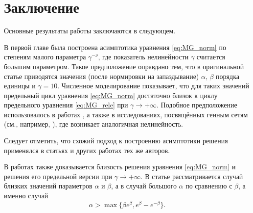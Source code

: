 \chapter*{Заключение}                       %


Основные результаты работы заключаются в следующем.


В первой главе была построена асимптотика уравнения \eqref{eq:MG_norm} по степеням малого параметра $\gamma^{-\nu}$, где показатель нелинейности $\gamma$ считается большим параметром. Такое предположение оправдано тем, что в оригинальной статье \cite{Mackey1977} приводятся значения (после нормировки на запаздывание) $\alpha$, $\beta$ порядка единицы и $\gamma = 10$. Численное моделирование показывает, что для таких значений предельный цикл уравнения \eqref{eq:MG_norm} достаточно близок к циклу предельного уравнения \eqref{eq:MG_rele} при $\gamma \to +\infty$. Подобное предположение использовалось в работах \cite{Bartha2021, Krisztin2020}, а также в исследованиях, посвящённых генным сетям (см., например, \cite{Volokitin2004}), где возникает аналогичная нелинейность.

Следует отметить, что схожий подход к построению асимптотики решения применялся в статьях \cite{Kolesov2010, Kolesov1997, Glyzin2013} и других работах тех же авторов.

В работах \cite{Bartha2021, Krisztin2020} также доказывается близость решения уравнения \eqref{eq:MG_norm} и решения его предельной версии при $\gamma \to +\infty$. В статье \cite{Krisztin2020} рассматривается случай близких значений параметров $\alpha$ и $\beta$, а в \cite{Bartha2021} случай большого $\alpha$ по сравнению с $\beta$, а именно случай 
\begin{equation*}
	\label{eq:cond_Bartha}
	\alpha > \max\{\beta e^\beta, e^\beta - e^{-\beta}\}.   
\end{equation*}

